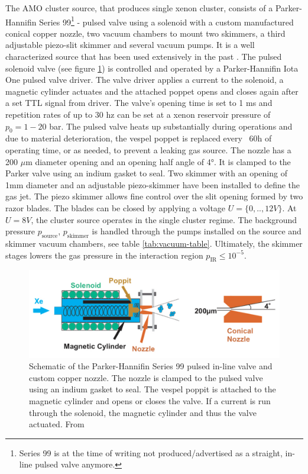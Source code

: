The AMO cluster source, that produces single xenon cluster, consists of a Parker-Hannifin Series 99\footnote{Series 99 is at the time of writing not produced/advertised as a straight, in-line pulsed valve anymore.} - pulsed valve using a solenoid with a custom manufactured conical copper nozzle, two vacuum chambers to mount two skimmers, a third adjustable piezo-slit skimmer and several vacuum pumps. It is a well characterized source that has been used extensively in the past \citep{Ferguson-2016-SciAdv,Ferguson-2015-JSR,Gorkhover-2012-PRL,Gorkhover-2016-NatPho,Rupp-2014-JCP}. The pulsed solenoid valve (see figure \ref{fig:parker-valve}) is controlled and operated by a Parker-Hannifin Iota One pulsed valve driver. The valve driver applies a current to the solenoid, a magnetic cylinder actuates and the attached poppet opens and closes again after a set TTL signal from driver. The valve's opening time is set to 1 ms and repetition rates of up to $30$ hz can be set at a xenon reservoir pressure of $p_{0}=1-20$ bar. The pulsed valve heats up substantially during operations and due to material deterioration, the vespel poppet is replaced every ~60h of operating time, or as needed, to prevent a leaking gas source. The nozzle has a 200 $\mu$m diameter opening and an opening half angle of 4°. It is clamped to the Parker valve using an indium gasket to seal. Two skimmer with an opening of 1mm diameter and an adjustable piezo-skimmer have been installed to define the gas jet. The piezo skimmer allows fine control over the slit opening formed by two razor blades. The blades can be closed by applying a voltage $U=\{0,..,12V\}$. At $U=8V$, the cluster source operates in the single cluster regime. The background pressure $p_{\text{source}}$, $p_{\text{skimmer}}$ is handled through the pumps installed on the source and skimmer vacuum chambers, see table \ref{tab:vacuum-table}. Ultimately, the skimmer stages lowers the gas pressure in the interaction region $p_{\text{IR}}\leq 10^{-5}$.\\
\begin{figure}
	\centering
		\includegraphics[width=1.00\textwidth]{images/parker-valve.png}
	\caption[Schematic of the Parker-Hannifin Series 99 valve.]{Schematic of the Parker-Hannifin Series 99 pulsed in-line valve and custom copper nozzle. The nozzle is clamped to the pulsed valve using an indium gasket to seal. The vespel poppit is attached to the magnetic cylinder and opens or closes the valve. If a current is run through the solenoid, the magnetic cylinder and thus the valve actuated. From \citep{Ferguson-2016-PhD}}
	\label{fig:parker-valve}
\end{figure}
